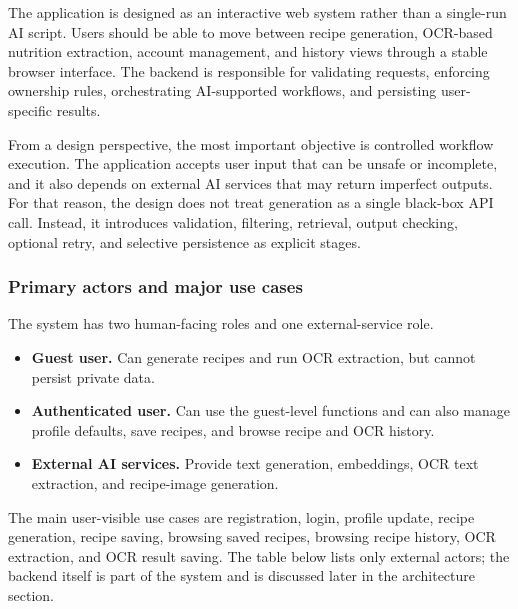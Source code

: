 The application is designed as an interactive web system rather than a
single-run AI script. Users should be able to move between recipe
generation, OCR-based nutrition extraction, account management, and
history views through a stable browser interface. The backend is
responsible for validating requests, enforcing ownership rules,
orchestrating AI-supported workflows, and persisting user-specific
results.

From a design perspective, the most important objective is controlled
workflow execution. The application accepts user input that can be
unsafe or incomplete, and it also depends on external AI services that
may return imperfect outputs. For that reason, the design does not
treat generation as a single black-box API call. Instead, it introduces
validation, filtering, retrieval, output checking, optional retry, and
selective persistence as explicit stages.

\subsubsection{Primary actors and major use cases}

The system has two human-facing roles and one external-service role.

\begin{itemize}
	\item \textbf{Guest user.} Can generate recipes and run OCR
	extraction, but cannot persist private data.
	\item \textbf{Authenticated user.} Can use the guest-level functions
   and can also manage profile defaults, save recipes, and browse recipe
   and OCR history.
	\item \textbf{External AI services.} Provide text generation,
	embeddings, OCR text extraction, and recipe-image generation.
\end{itemize}

The main user-visible use cases are registration, login, profile
update, recipe generation, recipe saving, browsing saved recipes,
browsing recipe history, OCR extraction, and OCR result saving. The
table below lists only external actors; the backend itself is part of
the system and is discussed later in the architecture section.

\par\bigskip

